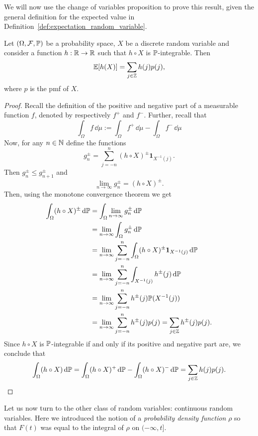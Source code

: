We will now use the change of variables proposition to prove this result, given the general definition for the expected value in Definition~\ref{def:expectation_random_variable}.


\begin{lemma}
Let $(\Omega, \mathcal F, \mathbb{P})$ be a probability space, $X$ be a discrete random variable and consider a function $h : \mathbb R \to \mathbb R$ such that $h\circ X$ is $\mathbb P$-integrable. Then
\[
	\mathbb E[h(X)] = \sum_{j \in \mathbb Z} h(j) p(j),
\] 
where $p$ is the pmf of $X$.
\end{lemma}

\begin{proof}
Recall the definition of the positive and negative part of a measurable function $f$, denoted by respectively $f^+$ and $f^-$. Further, recall that 
\[
	\int_\Omega f \, \dd \mu := \int_\Omega f^+ \, \dd \mu - \int_\Omega f^- \, \dd \mu 
\] 
Now, for any $n \in \mathbb N$ define the functions
\[
	g_n^\pm = \sum_{j = -n}^n (h \circ X)^\pm \mathbf{1}_{X^{-1}(j)}.
\]
Then $g_n^\pm \le g_{n+1}^\pm$ and
\[
	\lim_{n \to \infty} g_n^\pm = (h \circ X)^\pm.
\]
Then, using the monotone convergence theorem we get
\begin{align*}
	\int_\Omega (h \circ X)^\pm \, \mathrm{d} \mathbb P &= \int_\Omega \lim_{n \to \infty} g_n^\pm \, \mathrm{d} \mathbb P\\
	&= \lim_{n \to \infty} \int_\Omega g_n^\pm \, \mathrm{d} \mathbb P \\
	&= \lim_{n \to \infty} \sum_{j = -n}^n \int_\Omega (h \circ X)^\pm \mathbf{1}_{X^{-1}(j)} \, \mathrm{d} \mathbb P\\
	&= \lim_{n \to \infty} \sum_{j = -n}^n \int_{X^{-1}(j)} h^\pm(j) \, \mathrm{d} \mathbb P\\
	&= \lim_{n \to \infty} \sum_{j = -n}^n h^\pm(j) \mathbb P(X^{-1}(j)) \\
	&= \lim_{n \to \infty} \sum_{j = -n}^n h^\pm(j) p(j) = \sum_{j \in \mathbb Z} h^\pm(j) p(j).
\end{align*}
Since $h\circ X$ is $\mathbb P$-integrable if and only if its positive and negative part are, we conclude that
\[
	\int_\Omega (h \circ X) \, \mathrm{d} \mathbb P = \int_\Omega (h \circ X)^+ \, \mathrm{d} \mathbb P
	- \int_\Omega (h \circ X)^- \, \mathrm{d} \mathbb P = \sum_{j \in \mathbb Z} h(j) p(j).
\]
\end{proof}

Let us now turn to the other class of random variables: continuous random variables. Here we introduced the notion of a \emph{probability density function} $\rho$ so that $F(t)$ was equal to the integral of $\rho$ on $(-\infty,t]$. 

